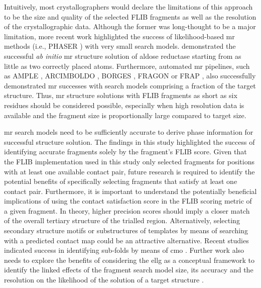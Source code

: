 Intuitively, most crystallographers would declare the limitations of this approach to be the size and quality of the selected FLIB fragments as well as the resolution of the crystallographic data. Although the former was long-thought to be a major limitation, more recent work highlighted the success of likelihood-based \gls{mr} methods (i.e., PHASER \cite{McCoy2007-mp}) with very small search models. \textcite{McCoy2017-cz} demonstrated the successful \textit{ab initio} \gls{mr} structure solution of aldose reductase starting from as little as two correctly placed atoms. Furthermore, automated \gls{mr} pipelines, such as AMPLE \cite{Bibby2012-lm}, ARCIMBOLDO \cite{Rodriguez2012-ad}, BORGES \cite{Sammito2013-ug}, FRAGON \cite{Jenkins2018-gf} or FRAP \cite{Shrestha2015-zb}, also successfully demonstrated \gls{mr} successes with search models comprising a fraction of the target structure. Thus, \gls{mr} structure solutions with FLIB fragments as short as six residues should be considered possible, especially when high resolution data is available and the fragment size is proportionally large compared to target size.

\Gls{mr} search models need to be sufficiently accurate to derive phase information for successful structure solution. The findings in this study highlighted the success of identifying accurate fragments solely by the fragment's FLIB score. Given that the FLIB implementation used in this study only selected fragments for positions with at least one available contact pair, future research is required to identify the potential benefits of specifically selecting fragments that satisfy at least one contact pair. Furthermore, it is important to understand the potentially beneficial implications of using the contact satisfaction score in the FLIB scoring metric of a given fragment. In theory, higher precision scores should imply a closer match of the overall tertiary structure of the trialled region. Alternatively, selecting secondary structure motifs or substructures of templates by means of searching with a predicted contact map could be an attractive alternative. Recent studies indicated success in identifying sub-folds by means of \gls{cmo} \cite{Buchan2017-ox,Ovchinnikov2017-nd}. Further work also needs to explore the benefits of considering the \gls{ellg} as a conceptual framework to identify the linked effects of the fragment search model size, its accuracy and the resolution on the likelihood of the solution of a target structure \cite{McCoy2017-cz}.

